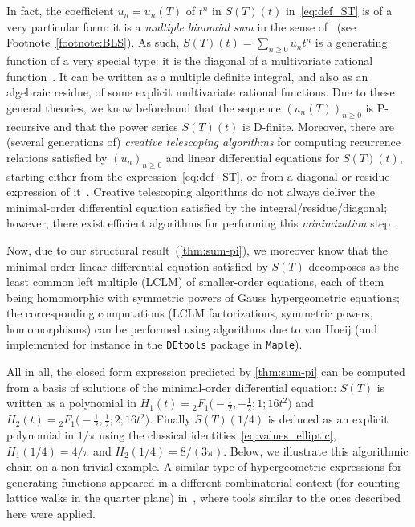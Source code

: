 \documentclass[12pt]{amsart}
\theoremstyle{plain}
\theoremstyle{remark}
\begin{document}
In fact, the coefficient $u_n = u_n(T)$ of $t^n$ in $S(T)(t)$ in~\eqref{eq:def_ST} is of a very particular form: it is a \emph{multiple binomial sum} in the sense of~\cite{BoLaSa17} (see Footnote~\ref{footnote:BLS}). As such, $S(T)(t) = \sum_{n \geq 0} u_n t^n$ is a generating function of a very special type: it is the diagonal of a multivariate rational function~\cite[\S3]{BoLaSa17}. It can be written as a multiple definite integral, and also as an algebraic residue, of some explicit multivariate rational functions. Due to these general theories, we know beforehand that the sequence $(u_n(T))_{n \geq 0}$
is P-recursive and that the power series $S(T)(t)$ is D-finite. Moreover, there are (several generations of) \emph{creative telescoping algorithms} for computing recurrence relations satisfied by $(u_n)_{n \geq 0}$ and linear differential equations for $S(T)(t)$, starting either from the expression~\eqref{eq:def_ST}, or from a diagonal or residue expression of it~\cite{Chyzak00,Koutschan10,BoLaSa13,Lairez16}. Creative telescoping algorithms do not always deliver the minimal-order differential equation satisfied by the integral/residue/diagonal; however, there exist efficient algorithms for performing this \emph{minimization} step~\cite{BoRiSa24}. 

Now, due to our structural result~(\cref{thm:sum-pi}), we moreover know that the minimal-order linear differential
equation satisfied by $S(T)$ decomposes as the least common left multiple (LCLM) of smaller-order
equations, each of them being homomorphic with symmetric powers of Gauss hypergeometric equations; the
corresponding computations (LCLM factorizations, symmetric powers, homomorphisms) can be performed
using algorithms due to van Hoeij \cite{Hoeij96} (and implemented for instance in the \texttt{DEtools} package in \texttt{Maple}).

All in all, the closed form expression predicted by \cref{thm:sum-pi} can be computed from a basis of solutions of the minimal-order differential equation: $S(T)$ is written as a polynomial in 
$H_1(t) = {}_{2}^{}{{}{{}{F_{1}^{}}}}\big(-\tfrac12,-\tfrac12; 1; 16 t^2\big)$
and
$H_2(t) = {}_{2}^{}{{}{{}{F_{1}^{}}}}\big(-\tfrac12,\tfrac12; 2; 16 t^2\big)$.
Finally $S(T)(1/4)$ is deduced as an explicit polynomial in $1/\pi$ using the classical identities~\eqref{eq:values_elliptic}, 
$H_1(1/4) = 4/\pi$ 
and
$H_2(1/4) = 8/(3\pi)$.
%
Below, we illustrate this algorithmic chain on a non-trivial example. A similar type of
hypergeometric expressions for generating functions appeared in a different combinatorial context
(for counting lattice walks in the quarter plane) in~\cite{BoChHoKaPe17}, where tools similar to
the ones described here were applied.
\end{document}
